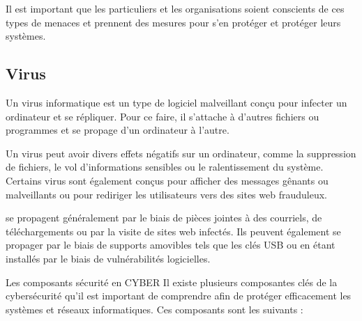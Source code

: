 Il est important que les particuliers et les organisations soient conscients de ces types de menaces et prennent des mesures pour s'en protéger et protéger leurs systèmes.


\subsection{Virus}
Un virus informatique est un type de logiciel malveillant conçu pour infecter un ordinateur et se répliquer. Pour ce faire, il s'attache à d'autres fichiers ou programmes et se propage d'un ordinateur à l'autre.

Un virus peut avoir divers effets négatifs sur un ordinateur, comme la suppression de fichiers, le vol d'informations sensibles ou le ralentissement du système. Certains virus sont également conçus pour afficher des messages gênants ou malveillants ou pour rediriger les utilisateurs vers des sites web frauduleux.



\begin{nota} se propagent généralement par le biais de pièces jointes à des courriels, de téléchargements ou par la visite de sites web infectés. Ils peuvent également se propager par le biais de supports amovibles tels que les clés USB ou en étant installés par le biais de vulnérabilités logicielles.\end{nota}

Les composants sécurité en CYBER 
Il existe plusieurs composantes clés de la cybersécurité qu'il est important de comprendre afin de protéger efficacement les systèmes et réseaux informatiques. Ces composants sont les suivants :

